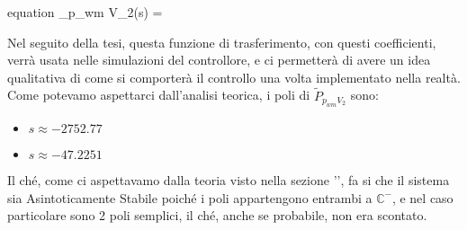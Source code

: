 \begin{Large}
	\begin{empheq}[box=\mathResult]{equation} \label{eq:StimaModelloInOut}
			_{p_{wm} V_2}(s) = 
	\end{empheq}
\end{Large}

\noindent
Nel seguito della tesi, questa funzione di trasferimento, con questi coefficienti, verrà usata nelle simulazioni del controllore, e ci permetterà di avere un idea qualitativa di come si comporterà il controllo una volta implementato nella realtà.\\
Come potevamo aspettarci dall'analisi teorica, i poli di $ \tilde{P}_{p_{wm} V_2} $ sono:
\begin{itemize}
	\item $ s\approx-2752.77 $
	\item $ s\approx-47.2251 $
\end{itemize}
\noindent
Il ché, come ci aspettavamo dalla teoria visto nella sezione '', fa si che il sistema sia Asintoticamente Stabile poiché i poli appartengono entrambi a $ \mathbb{C}^- $, e nel caso particolare sono 2 poli semplici, il ché, anche se probabile, non era scontato.





